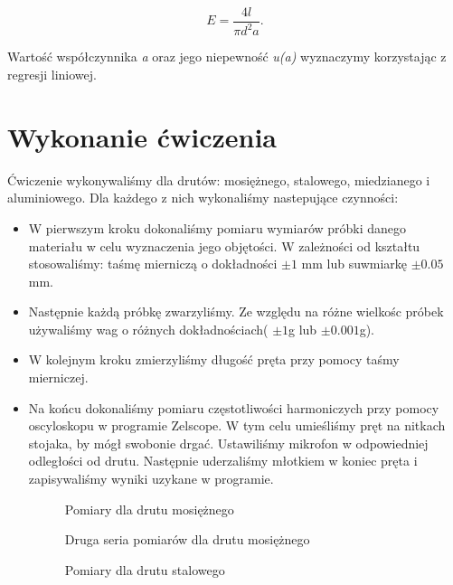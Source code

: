 \documentclass [a4paper,11pt]{article}
\begin{document}
	\begin{equation}
	\label{eq:wzorroboczy}
	E = \frac{4l}{\pi d^2 a} \text{.}
	\end{equation}
	
	Wartość współczynnika \textit{a} oraz jego niepewność \textit{u(a)} wyznaczymy korzystając z regresji liniowej.
	\section{Wykonanie ćwiczenia}
	Ćwiczenie wykonywaliśmy dla drutów: mosiężnego, stalowego, miedzianego i aluminiowego. Dla każdego z nich wykonaliśmy nastepujące czynności:
	\begin{itemize}
		\item W pierwszym kroku dokonaliśmy pomiaru wymiarów próbki danego materiału w celu wyznaczenia jego objętości. W zależności od kształtu stosowaliśmy: taśmę mierniczą o dokładności $\pm1$ mm lub suwmiarkę $\pm0.05$ mm.
		\item Następnie każdą próbkę zwarzyliśmy. Ze względu na różne wielkośc próbek używaliśmy wag o różnych dokładnościach( $\pm1$g lub $\pm0.001$g).
		
		\item W kolejnym kroku zmierzyliśmy długość pręta przy pomocy taśmy mierniczej.
		
		\item Na końcu dokonaliśmy pomiaru częstotliwości harmoniczych przy pomocy oscyloskopu w programie Zelscope. W tym celu umieśliśmy pręt na nitkach stojaka, by mógł swobonie drgać. Ustawiliśmy mikrofon w odpowiedniej odległości od drutu. Następnie uderzaliśmy młotkiem w koniec pręta i zapisywaliśmy wyniki uzykane w programie.  
	
	\renewcommand*{\figurename}{Tabela} 
	\setcounter{figure}{0}
	
	\begin{figure}[!h]
		\centering
		\caption{Pomiary dla drutu mosiężnego}

		\label{fig:tebmosiadz}
	\end{figure}
	
	\begin{figure}[!h]
		\centering
		\caption{Druga seria pomiarów dla drutu mosiężnego}

		\label{fig:tebmosiadz2}
	\end{figure}
	
	\begin{figure}[!h]
		\centering
		\caption{Pomiary dla drutu stalowego}
		\label{fig:tabstal}
	\end{figure}
		
	\end{itemize}
\end{document}
